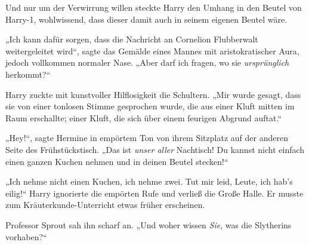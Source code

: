 Und nur um der Verwirrung willen steckte Harry den Umhang in den Beutel von Harry-1, wohlwissend, dass dieser damit auch in seinem eigenen Beutel wäre.

\later

„Ich kann dafür sorgen, dass die Nachricht an Cornelion Flubberwalt weitergeleitet wird“, sagte das Gemälde eines Mannes mit aristokratischer Aura, jedoch vollkommen normaler Nase. „Aber darf ich fragen, wo sie \emph{ursprünglich} herkommt?“

Harry zuckte mit kunstvoller Hilflosigkeit die Schultern. „Mir wurde gesagt, dass sie von einer tonlosen Stimme gesprochen wurde, die aus einer Kluft mitten im Raum erschallte; einer Kluft, die sich über einem feurigen Abgrund auftat.“

\later

„Hey!“, sagte Hermine in empörtem Ton von ihrem Sitzplatz auf der anderen Seite des Frühstückstisch. „Das ist \emph{unser aller} Nachtisch! Du kannst nicht einfach einen ganzen Kuchen nehmen und in deinen Beutel stecken!“

„Ich nehme nicht einen Kuchen, ich nehme zwei. Tut mir leid, Leute, ich hab’s eilig!“ Harry ignorierte die empörten Rufe und verließ die Große Halle. Er musste zum Kräuterkunde-Unterricht etwas früher erscheinen.

\later

Professor Sprout sah ihn scharf an. „Und woher wissen \emph{Sie}, was die Slytherins vorhaben?“

